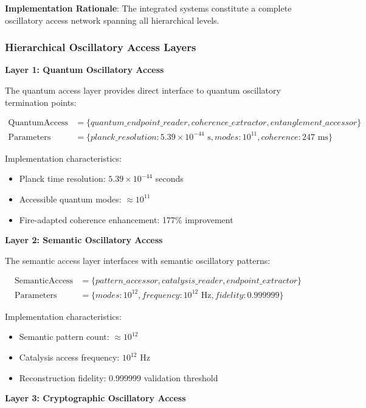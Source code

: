 \documentclass[12pt,a4paper]{article}
\begin{document}
{{{{{{{{{{{{{{\textbf{Implementation Rationale}: The integrated systems constitute a complete oscillatory access network spanning all hierarchical levels.

\subsubsection{Hierarchical Oscillatory Access Layers}

\textbf{Layer 1: Quantum Oscillatory Access}

The quantum access layer provides direct interface to quantum oscillatory termination points:

\begin{align}
\text{QuantumAccess} &= \{quantum\_endpoint\_reader, coherence\_extractor, entanglement\_accessor\} \\
\text{Parameters} &= \{planck\_resolution: 5.39 \times 10^{-44} \text{ s}, modes: 10^{11}, coherence: 247 \text{ ms}\}
\end{align}

Implementation characteristics:
\begin{itemize}
\item Planck time resolution: $5.39 \times 10^{-44}$ seconds
\item Accessible quantum modes: $\approx 10^{11}$
\item Fire-adapted coherence enhancement: 177\% improvement
\end{itemize}

\textbf{Layer 2: Semantic Oscillatory Access}

The semantic access layer interfaces with semantic oscillatory patterns:

\begin{align}
\text{SemanticAccess} &= \{pattern\_accessor, catalysis\_reader, endpoint\_extractor\} \\
\text{Parameters} &= \{modes: 10^{12}, frequency: 10^{12} \text{ Hz}, fidelity: 0.999999\}
\end{align}

Implementation characteristics:
\begin{itemize}
\item Semantic pattern count: $\approx 10^{12}$
\item Catalysis access frequency: $10^{12}$ Hz
\item Reconstruction fidelity: 0.999999 validation threshold
\end{itemize}

\textbf{Layer 3: Cryptographic Oscillatory Access}

}}}}}}}}}}}}}}
\end{document}
